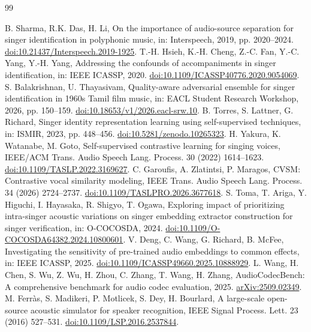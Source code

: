 \documentclass[10pt,a4paper]{article}
\begin{document}
\begin{thebibliography}{99}
\small\raggedright
{} B. Sharma, R.K. Das, H. Li, On the importance of audio-source separation for singer identification in polyphonic music, in: Interspeech, 2019, pp. 2020--2024. \href{https://doi.org/10.21437/Interspeech.2019-1925}{doi:10.21437/Interspeech.2019-1925}.
 T.-H. Hsieh, K.-H. Cheng, Z.-C. Fan, Y.-C. Yang, Y.-H. Yang, Addressing the confounds of accompaniments in singer identification, in: IEEE ICASSP, 2020. \href{https://doi.org/10.1109/ICASSP40776.2020.9054069}{doi:10.1109/ICASSP40776.2020.9054069}.
 S. Balakrishnan, U. Thayasivam, Quality-aware adversarial ensemble for singer identification in 1960s Tamil film music, in: EACL Student Research Workshop, 2026, pp. 150--159. \href{https://doi.org/10.18653/v1/2026.eacl-srw.10}{doi:10.18653/v1/2026.eacl-srw.10}.
 B. Torres, S. Lattner, G. Richard, Singer identity representation learning using self-supervised techniques, in: ISMIR, 2023, pp. 448--456. \href{https://doi.org/10.5281/zenodo.10265323}{doi:10.5281/zenodo.10265323}.
 H. Yakura, K. Watanabe, M. Goto, Self-supervised contrastive learning for singing voices, IEEE/ACM Trans. Audio Speech Lang. Process. 30 (2022) 1614--1623. \href{https://doi.org/10.1109/TASLP.2022.3169627}{doi:10.1109/TASLP.2022.3169627}.
 C. Garoufis, A. Zlatintsi, P. Maragos, CVSM: Contrastive vocal similarity modeling, IEEE Trans. Audio Speech Lang. Process. 34 (2026) 2724--2737. \href{https://doi.org/10.1109/TASLPRO.2026.3677618}{doi:10.1109/TASLPRO.2026.3677618}.
 S. Toma, T. Ariga, Y. Higuchi, I. Hayasaka, R. Shigyo, T. Ogawa, Exploring impact of prioritizing intra-singer acoustic variations on singer embedding extractor construction for singer verification, in: O-COCOSDA, 2024. \href{https://doi.org/10.1109/O-COCOSDA64382.2024.10800601}{doi:10.1109/O-COCOSDA64382.2024.10800601}.
 V. Deng, C. Wang, G. Richard, B. McFee, Investigating the sensitivity of pre-trained audio embeddings to common effects, in: IEEE ICASSP, 2025. \href{https://doi.org/10.1109/ICASSP49660.2025.10888929}{doi:10.1109/ICASSP49660.2025.10888929}.
 L. Wang, H. Chen, S. Wu, Z. Wu, H. Zhou, C. Zhang, T. Wang, H. Zhang, AudioCodecBench: A comprehensive benchmark for audio codec evaluation, 2025. \href{https://arxiv.org/abs/2509.02349}{arXiv:2509.02349}.
 M. Ferr\`as, S. Madikeri, P. Motlicek, S. Dey, H. Bourlard, A large-scale open-source acoustic simulator for speaker recognition, IEEE Signal Process. Lett. 23 (2016) 527--531. \href{https://doi.org/10.1109/LSP.2016.2537844}{doi:10.1109/LSP.2016.2537844}.

\end{thebibliography}
\end{document}
